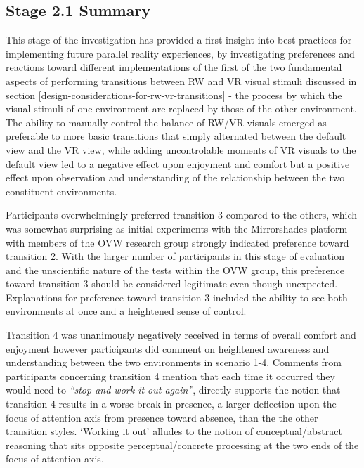 
\subsection{Stage 2.1 Summary}

This stage of the investigation has provided a first insight into best practices for implementing future parallel reality experiences, by investigating preferences and reactions toward different implementations of the first of the two fundamental aspects of performing transitions between RW and VR visual stimuli discussed in section \ref{design-considerations-for-rw-vr-transitions} - the process by which the visual stimuli of one environment are replaced by those of the other environment. The ability to manually control the balance of RW/VR visuals emerged as preferable to more basic transitions that simply alternated between the default view and the VR view, while adding uncontrolable moments of VR visuals to the default view led to a negative effect upon enjoyment and comfort but a positive effect upon observation and understanding of the relationship between the two constituent environments.

Participants overwhelmingly preferred transition 3 compared to the others, which was somewhat surprising as initial experiments with the Mirrorshades platform with members of the OVW research group strongly indicated preference toward transition 2. With the larger number of participants in this stage of evaluation and the unscientific nature of the tests within the OVW group, this preference toward transition 3 should be considered legitimate even though unexpected. Explanations for preference toward transition 3 included the ability to see both environments at once and a heightened sense of control.

Transition 4 was unanimously negatively received in terms of overall comfort and enjoyment however participants did comment on heightened awareness and understanding between the two environments in scenario 1-4. Comments from participants concerning transition 4 mention that each time it occurred they would need to \textit{``stop and work it out again''}, directly supports the notion that transition 4 results in a worse break in presence, a larger deflection upon the focus of attention axis from presence toward absence, than the the other transition styles. `Working it out' alludes to the notion of conceptual/abstract reasoning that sits opposite perceptual/concrete processing at the two ends of the focus of attention axis.

